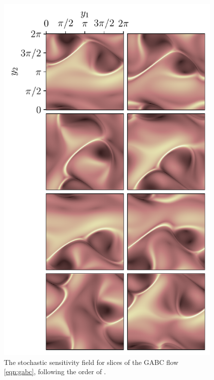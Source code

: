 \begin{landscape}
\begin{figure}
		\includegraphics[width=0.42\textheight]{chp04_paper_numerics/figures/gabc/S2_slices_xy}
		\caption{The stochastic sensitivity field for slices of the GABC flow \cref{eqn:gabc}, following the order of .}
		\label{fig:gabc_S2}
	\end{figure}
\end{landscape}
